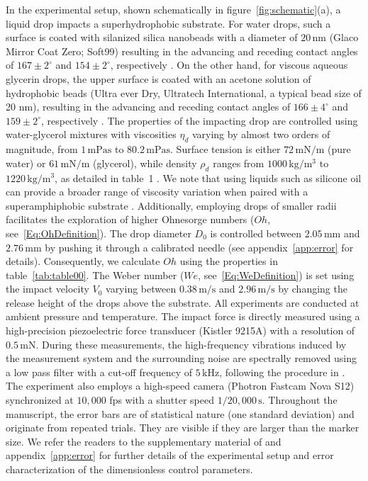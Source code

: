 \documentclass{jfm}
\begin{document}
	In the experimental setup, shown schematically in figure~\ref{fig:schematic}(a), a liquid drop impacts a superhydrophobic substrate. For water drops, such a surface is coated with silanized silica nanobeads with a diameter of $20\,\si{\nano\meter}$ (Glaco Mirror Coat Zero; Soft99) resulting in the advancing and receding contact angles of $167 \pm 2^{\circ}$ and $154 \pm 2^{\circ}$, respectively \citep{Gauthier2015, Li2017}. On the other hand, for viscous aqueous glycerin drops, the upper surface is coated with an acetone solution of hydrophobic beads (Ultra ever Dry, Ultratech International, a typical bead size of 20 nm), resulting in the advancing and receding contact angles of $166 \pm 4^{\circ}$ and $159 \pm 2^{\circ}$, respectively \citep{Jha2020}. 
	The properties of the impacting drop are controlled using water-glycerol mixtures with viscosities $\eta_d$ varying by almost two orders of magnitude, from $1\,\si{\milli\pascal}\si{\second}$ to $80.2\,\si{\milli\pascal}\si{\second}$. Surface tension is either $72\,\si{\milli\newton}/\si{\meter}$ (pure water) or $61\,\si{\milli\newton}/\si{\meter}$ (glycerol), while density $\rho_d$ ranges from $1000\,\si{\kilo\gram}/\si{\cubic\meter}$ to $1220\,\si{\kilo\gram}/\si{\cubic\meter}$, as detailed in table~1 \citep{cheng2008formula, volk2018density, Jha2020}.
	We note that using liquids such as silicone oil can provide a broader range of viscosity variation when paired with a superamphiphobic substrate \citep{deng2012candle}. Additionally, employing drops of smaller radii facilitates the exploration of higher Ohnesorge numbers ($Oh$, see~\eqref{Eq:OhDefinition}). 
	The drop diameter $D_0$ is controlled between $2.05\,\si{\milli\meter}$ and $2.76\,\si{\milli\meter}$ by pushing it through a calibrated needle (see appendix~\ref{app:error} for details). 
	Consequently, we calculate $Oh$ using the properties in table~\ref{tab:table00}.
	The Weber number ($We$, see~\eqref{Eq:WeDefinition}) is set using the impact velocity $V_0$ varying between $0.38\,\si{\meter}/\si{\second}$ and $2.96\,\si{\meter}/\si{\second}$ by changing the release height of the drops above the substrate. 
	All experiments are conducted at ambient pressure and temperature. The impact force is directly measured using a high-precision piezoelectric force transducer (Kistler 9215A) with a resolution of $0.5\,\si{\milli\newton}$. During these measurements, the high-frequency vibrations induced by the measurement system and the surrounding noise are spectrally removed using a low pass filter with a cut-off frequency of $5\,\si{\kilo\hertz}$, following the procedure in \citet{Li2014, Zhang2017, Gordillo2018, Mitchell2019}. 
	The experiment also employs a high-speed camera (Photron Fastcam Nova S12) synchronized at $10,000$ fps with a shutter speed $1/20,000\,\si{\second}$. Throughout the manuscript, the error bars are of statistical nature (one standard deviation) and originate from repeated trials. They are visible if they are larger than the marker size. We refer the readers to the supplementary material of \citet{zhang2022impact}  and appendix~\ref{app:error} for further details of the experimental setup and error characterization of the dimensionless control parameters.
	
\end{document}
